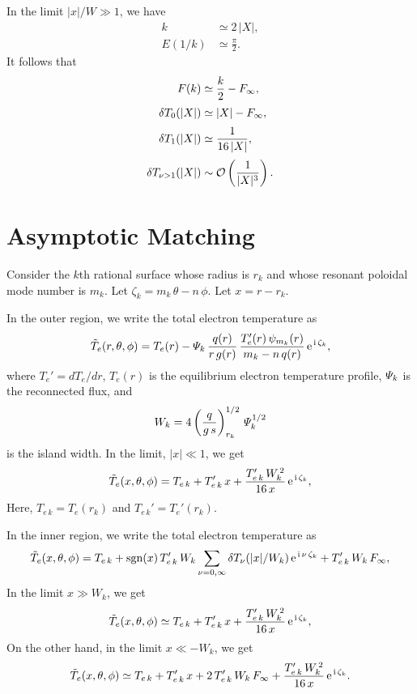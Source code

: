 \documentclass[12pt,prb,aps,notitlepage]{revtex4-1}
\begin{document}
In the limit $|x|/W\gg 1$, we have
\begin{align}
k&\simeq 2\,|X|,\\[0.5ex]
E(1/k) &\simeq \frac{\pi}{2}.
\end{align}
It follows that 
\begin{align}
F(k) &\simeq \frac{k}{2} - F_\infty,\\[0.5ex]
\delta T_0(|X|)&\simeq |X| - F_\infty,\\[0.5ex]
\delta T_1(|X|) &\simeq \frac{1}{16\,|X|},\\[0.5ex]
\delta T_{\nu>1}(|X|)& \sim {\cal O}\left(\frac{1}{|X|^3}\right).
\end{align}

\section{Asymptotic Matching}
Consider the $k$th rational surface whose radius is $r_k$ and whose resonant poloidal mode number is $m_k$. Let $\zeta_k=m_k\,\theta-n\,\phi$. 
Let $x=r-r_k$.

 In the outer region,  we write the total electron temperature as 
\begin{equation}
\tilde{T}_e(r, \theta,\phi)=T_e(r) - {\mit\Psi}_k\,\frac{q(r)}{r\,g(r)}\,\frac{T_e'(r)\,\psi_{m_k}(r)}{m_k-n\,q(r)}\,{\rm e}^{\,{\rm i}\,\zeta_k},
\end{equation}
where $T_e'=dT_e/dr$, $T_e(r)$ is the equilibrium electron temperature profile, ${\mit\Psi}_k$ is the reconnected flux, and 
\begin{equation}
W_k = 4\left(\frac{q}{g\,s}\right)^{1/2}_{r_k}\,{\mit\Psi}_k^{1/2}
\end{equation}
is the island width. In the limit, $|x|\ll 1$, we get
\begin{equation}
\tilde{T}_e(x, \theta,\phi)=T_{e\,k} + T_{e\,k}'\,x + \frac{T_{e\,k}'\,W_k^{\,2}}{16\,x}\,{\rm e}^{\,{\rm i}\,\zeta_k},
\end{equation}
Here, $T_{e\,k}=T_e(r_k)$ and $T_{e\,k}'= T_e'(r_k)$. 

In the inner region, we write the total electron temperature as 
\begin{equation}
\tilde{T}_e(x, \theta,\phi)=T_{e\,k} +{\rm sgn}(x)\,T_{e\,k}'\,W_k\sum_{\nu=0,\infty}\delta T_\nu(|x|/W_k)\,{\rm e}^{\,{\rm i}\,\nu\,\zeta_k}+T_{e\,k}'\,W_k\,F_\infty,
\end{equation}
In the limit $x\gg W_k$, we get
\begin{equation}
\tilde{T}_e(x,\theta,\phi) \simeq T_{e\,k} + T_{e\,k}'\,x + \frac{T_{e\,k}'\,W_k^{\,2}}{16\,x}\,{\rm e}^{\,{\rm i}\,\zeta_k},
\end{equation}
On the other hand, in the limit $x\ll -W_k$, we get 
\begin{equation}
\tilde{T}_e(x,\theta,\phi) \simeq T_{e\,k} + T_{e\,k}'\,x  + 2\,T_{e\,k}'\,W_k\,F_\infty + \frac{T_{e\,k}'\,W_k^{\,2}}{16\,x}\,{\rm e}^{\,{\rm i}\,\zeta_k}.
\end{equation}
\end{document}
